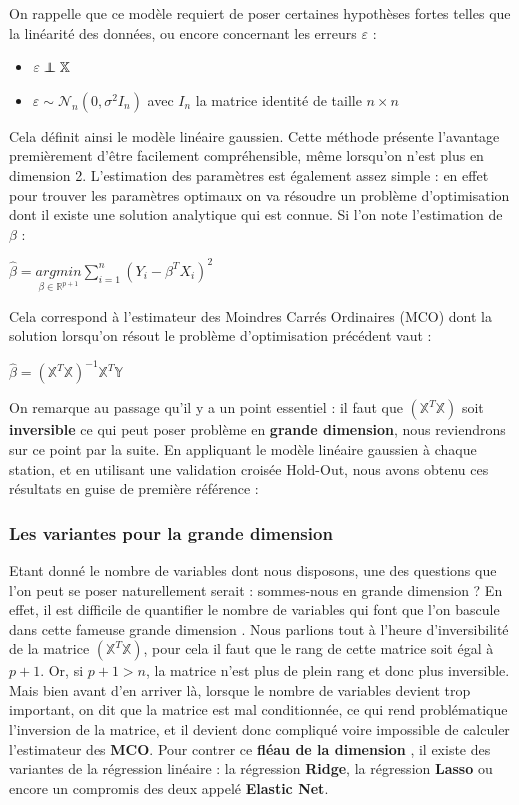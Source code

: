 \documentclass[14pt, openany]{article}
\newcommand\independent{\protect\mathpalette{\protect\independenT}{\perp}}
\def\independenT#1#2{\mathrel{\rlap{$#1#2$}\mkern2mu{#1#2}}}
\begin{document}
On rappelle que ce modèle requiert de poser certaines hypothèses fortes telles que la linéarité des données, ou encore concernant les erreurs $\varepsilon$ :
\begin{itemize}
\item $ \varepsilon \independent \mathbb{X}$
\item $\varepsilon \sim \mathcal{N}_n(0,\sigma^2I_n)$ avec $I_n$ la matrice identité de taille $n \times n$
\end{itemize}
Cela définit ainsi le modèle linéaire gaussien. Cette méthode présente l'avantage premièrement d'être facilement compréhensible, même lorsqu'on n'est plus en dimension 2. L'estimation des paramètres est également assez \og simple \fg{} : en effet pour trouver les paramètres optimaux on va résoudre un problème d'optimisation dont il existe une solution analytique qui est connue. Si l'on note l'estimation de $\beta$ : 
\begin{center}
$\hat{\beta} = \underset{\beta\in\mathbb{R}^{p+1} }{argmin}\sum\limits_{i=1}^n(Y_i-\beta^TX_i)^2$
\end{center}
Cela correspond à l'estimateur des Moindres Carrés Ordinaires (MCO) dont la solution lorsqu'on résout le problème d'optimisation précédent vaut :
\begin{center}
$\hat{\beta} = (\mathbb{X}^T\mathbb{X})^{-1}\mathbb{X}^T\mathbb{Y}$
\end{center}
On remarque au passage qu'il y a un point essentiel : il faut que $(\mathbb{X}^T\mathbb{X})$ soit \textbf{inversible} ce qui peut poser problème en \textbf{grande dimension}, nous reviendrons sur ce point par la suite. En appliquant le modèle linéaire gaussien à chaque station, et en utilisant une validation croisée Hold-Out, nous avons obtenu ces résultats en guise de première référence :
\subsubsection{Les variantes pour la grande dimension}
Etant donné le nombre de variables dont nous disposons, une des questions que l'on peut se poser naturellement serait : sommes-nous en grande dimension ? En effet, il est difficile de quantifier le nombre de variables qui font que l'on bascule dans cette fameuse \og grande dimension \fg{}. Nous parlions tout à l'heure d'inversibilité de la matrice $(\mathbb{X}^T\mathbb{X})$, pour cela il faut que le rang de cette matrice soit égal à $p+1$. Or, si $p+1 > n$, la matrice n'est plus de plein rang et donc plus inversible. Mais bien avant d'en arriver là, lorsque le nombre de variables devient trop important, on dit que la matrice est mal conditionnée, ce qui rend problématique l'inversion de la matrice, et il devient donc compliqué voire impossible de calculer l'estimateur des \textbf{MCO}. Pour contrer ce \og \textbf{fléau de la dimension} \fg{}, il existe des variantes de la régression linéaire : la régression \textbf{Ridge}, la régression \textbf{Lasso} ou encore un compromis des deux appelé \textbf{Elastic Net}.
\end{document}
